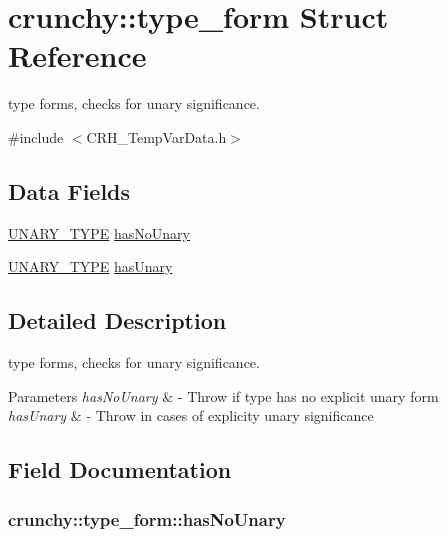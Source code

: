 \hypertarget{structcrunchy_1_1type__form}{}\section{crunchy\+:\+:type\+\_\+form Struct Reference}
\label{structcrunchy_1_1type__form}


type forms, checks for unary significance.  




{\ttfamily \#include $<$C\+R\+H\+\_\+\+Temp\+Var\+Data.\+h$>$}

\subsection*{Data Fields}
\begin{DoxyCompactItemize}
\item 
\hyperlink{_c_r_h___temp_var_data_8h_af66cdd64c4d0c558d4cb016c4e0d6694}{U\+N\+A\+R\+Y\+\_\+\+T\+Y\+PE} \hyperlink{structcrunchy_1_1type__form_a5941739fb7b37a91b52fe240614aa388}{has\+No\+Unary}
\item 
\hyperlink{_c_r_h___temp_var_data_8h_af66cdd64c4d0c558d4cb016c4e0d6694}{U\+N\+A\+R\+Y\+\_\+\+T\+Y\+PE} \hyperlink{structcrunchy_1_1type__form_a78a0fdae7e17412ea3a5374fa7d0925c}{has\+Unary}
\end{DoxyCompactItemize}


\subsection{Detailed Description}
type forms, checks for unary significance. 


\begin{DoxyParams}{Parameters}
{\em has\+No\+Unary} & -\/ Throw if type has no explicit unary form \\
\hline
{\em has\+Unary} & -\/ Throw in cases of explicity unary significance \\
\hline
\end{DoxyParams}


\subsection{Field Documentation}
\subsubsection[{has\+No\+Unary}]{ crunchy\+::type\+\_\+form\+::has\+No\+Unary}\hypertarget{structcrunchy_1_1type__form_a5941739fb7b37a91b52fe240614aa388}{}\label{structcrunchy_1_1type__form_a5941739fb7b37a91b52fe240614aa388}

